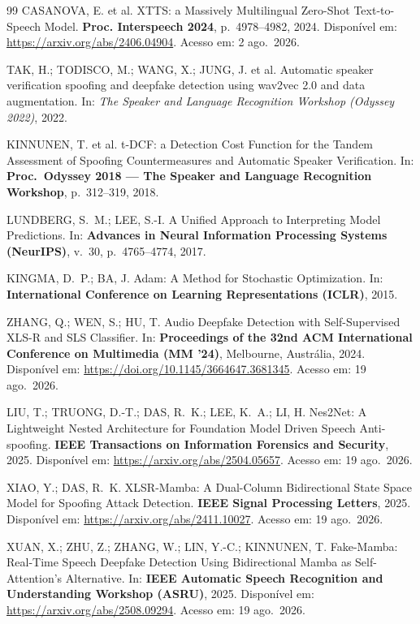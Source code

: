 \documentclass[12pt,a4paper]{article}
\begin{document}
\begin{thebibliography}{99}
	CASANOVA, E. et al.
	XTTS: a Massively Multilingual Zero-Shot Text-to-Speech Model.
	\textbf{Proc. Interspeech 2024}, p.~4978--4982, 2024.
	Disponível em: \url{https://arxiv.org/abs/2406.04904}.
	Acesso em: 2 ago.\ 2026.
	
	TAK, H.; TODISCO, M.; WANG, X.; JUNG, J. et al.
	Automatic speaker verification spoofing and deepfake detection using wav2vec
	2.0 and data augmentation.
	In: \textit{The Speaker and Language Recognition Workshop (Odyssey 2022)},
	2022.
	
	KINNUNEN, T. et al.
	t-DCF: a Detection Cost Function for the Tandem Assessment of Spoofing
	Countermeasures and Automatic Speaker Verification.
	In: \textbf{Proc.\ Odyssey 2018 --- The Speaker and Language Recognition
		Workshop}, p.~312--319, 2018.
	
	LUNDBERG, S.~M.; LEE, S.-I.
	A Unified Approach to Interpreting Model Predictions.
	In: \textbf{Advances in Neural Information Processing Systems (NeurIPS)},
	v.~30, p.~4765--4774, 2017.
	
	KINGMA, D.~P.; BA, J.
	Adam: A Method for Stochastic Optimization.
	In: \textbf{International Conference on Learning Representations (ICLR)},
	2015.
	
	ZHANG, Q.; WEN, S.; HU, T.
	Audio Deepfake Detection with Self-Supervised XLS-R and SLS Classifier.
	In: \textbf{Proceedings of the 32nd ACM International Conference on
		Multimedia (MM '24)}, Melbourne, Austrália, 2024.
	Disponível em: \url{https://doi.org/10.1145/3664647.3681345}.
	Acesso em: 19 ago.\ 2026.
	
	LIU, T.; TRUONG, D.-T.; DAS, R.~K.; LEE, K.~A.; LI, H.
	Nes2Net: A Lightweight Nested Architecture for Foundation Model Driven Speech
	Anti-spoofing.
	\textbf{IEEE Transactions on Information Forensics and Security}, 2025.
	Disponível em: \url{https://arxiv.org/abs/2504.05657}.
	Acesso em: 19 ago.\ 2026.
	
	XIAO, Y.; DAS, R.~K.
	XLSR-Mamba: A Dual-Column Bidirectional State Space Model for Spoofing Attack
	Detection.
	\textbf{IEEE Signal Processing Letters}, 2025.
	Disponível em: \url{https://arxiv.org/abs/2411.10027}.
	Acesso em: 19 ago.\ 2026.
	
	XUAN, X.; ZHU, Z.; ZHANG, W.; LIN, Y.-C.; KINNUNEN, T.
	Fake-Mamba: Real-Time Speech Deepfake Detection Using Bidirectional Mamba as
	Self-Attention's Alternative.
	In: \textbf{IEEE Automatic Speech Recognition and Understanding Workshop
		(ASRU)}, 2025.
	Disponível em: \url{https://arxiv.org/abs/2508.09294}.
	Acesso em: 19 ago.\ 2026.
	

\end{thebibliography}
\end{document}
